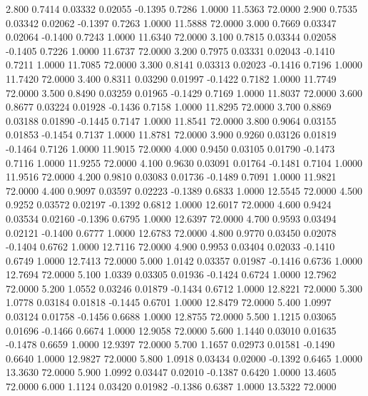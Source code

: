    2.800   0.7414   0.03332   0.02055  -0.1395   0.7286   1.0000  11.5363  72.0000
   2.900   0.7535   0.03342   0.02062  -0.1397   0.7263   1.0000  11.5888  72.0000
   3.000   0.7669   0.03347   0.02064  -0.1400   0.7243   1.0000  11.6340  72.0000
   3.100   0.7815   0.03344   0.02058  -0.1405   0.7226   1.0000  11.6737  72.0000
   3.200   0.7975   0.03331   0.02043  -0.1410   0.7211   1.0000  11.7085  72.0000
   3.300   0.8141   0.03313   0.02023  -0.1416   0.7196   1.0000  11.7420  72.0000
   3.400   0.8311   0.03290   0.01997  -0.1422   0.7182   1.0000  11.7749  72.0000
   3.500   0.8490   0.03259   0.01965  -0.1429   0.7169   1.0000  11.8037  72.0000
   3.600   0.8677   0.03224   0.01928  -0.1436   0.7158   1.0000  11.8295  72.0000
   3.700   0.8869   0.03188   0.01890  -0.1445   0.7147   1.0000  11.8541  72.0000
   3.800   0.9064   0.03155   0.01853  -0.1454   0.7137   1.0000  11.8781  72.0000
   3.900   0.9260   0.03126   0.01819  -0.1464   0.7126   1.0000  11.9015  72.0000
   4.000   0.9450   0.03105   0.01790  -0.1473   0.7116   1.0000  11.9255  72.0000
   4.100   0.9630   0.03091   0.01764  -0.1481   0.7104   1.0000  11.9516  72.0000
   4.200   0.9810   0.03083   0.01736  -0.1489   0.7091   1.0000  11.9821  72.0000
   4.400   0.9097   0.03597   0.02223  -0.1389   0.6833   1.0000  12.5545  72.0000
   4.500   0.9252   0.03572   0.02197  -0.1392   0.6812   1.0000  12.6017  72.0000
   4.600   0.9424   0.03534   0.02160  -0.1396   0.6795   1.0000  12.6397  72.0000
   4.700   0.9593   0.03494   0.02121  -0.1400   0.6777   1.0000  12.6783  72.0000
   4.800   0.9770   0.03450   0.02078  -0.1404   0.6762   1.0000  12.7116  72.0000
   4.900   0.9953   0.03404   0.02033  -0.1410   0.6749   1.0000  12.7413  72.0000
   5.000   1.0142   0.03357   0.01987  -0.1416   0.6736   1.0000  12.7694  72.0000
   5.100   1.0339   0.03305   0.01936  -0.1424   0.6724   1.0000  12.7962  72.0000
   5.200   1.0552   0.03246   0.01879  -0.1434   0.6712   1.0000  12.8221  72.0000
   5.300   1.0778   0.03184   0.01818  -0.1445   0.6701   1.0000  12.8479  72.0000
   5.400   1.0997   0.03124   0.01758  -0.1456   0.6688   1.0000  12.8755  72.0000
   5.500   1.1215   0.03065   0.01696  -0.1466   0.6674   1.0000  12.9058  72.0000
   5.600   1.1440   0.03010   0.01635  -0.1478   0.6659   1.0000  12.9397  72.0000
   5.700   1.1657   0.02973   0.01581  -0.1490   0.6640   1.0000  12.9827  72.0000
   5.800   1.0918   0.03434   0.02000  -0.1392   0.6465   1.0000  13.3630  72.0000
   5.900   1.0992   0.03447   0.02010  -0.1387   0.6420   1.0000  13.4605  72.0000
   6.000   1.1124   0.03420   0.01982  -0.1386   0.6387   1.0000  13.5322  72.0000
